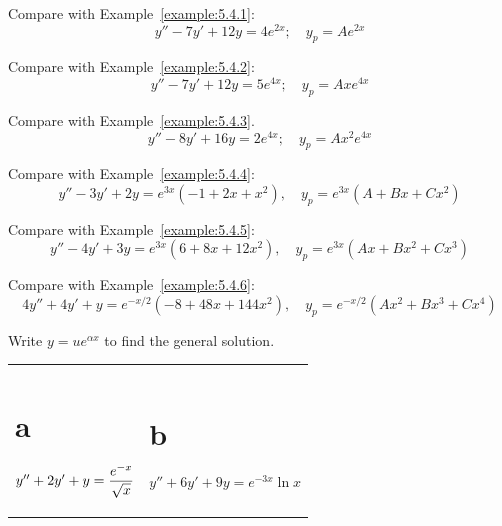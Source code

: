 \begin{exerciselist}

  \item\label{exer:5.4.31} Compare with Example~\ref{example:5.4.1}:
  \[
    y''-7y'+12y=4e^{2x};\quad y_{p}=Ae^{2x}
  \]

  \item\label{exer:5.4.32} Compare with Example~\ref{example:5.4.2}:
  \[
    y''-7y'+12y=5e^{4x};\quad y_{p}=Axe^{4x}
  \]

  \item\label{exer:5.4.33} Compare with Example~\ref{example:5.4.3}.
  \[
    y''-8y'+16y=2e^{4x};\quad y_{p}=Ax^{2}e^{4x}
  \]

  \item\label{exer:5.4.34} Compare with Example~\ref{example:5.4.4}:
  \[
    y''-3y'+2y=e^{3x}(-1+2x+x^{2}),\quad y_{p}=e^{3x}(A+Bx+Cx^{2})
  \]

  \item\label{exer:5.4.35} Compare with Example~\ref{example:5.4.5}:
  \[
    y''-4y'+3y=e^{3x}(6+8x+12x^{2}),\quad y_{p}=e^{3x}(Ax+Bx^{2}+Cx^{3})
  \]

  \item\label{exer:5.4.36} Compare with Example~\ref{example:5.4.6}:
  \[
    4y''+4y'+y=e^{-x/2}(-8+48x+144x^{2}),\quad y_{p}=e^{-x/2}(Ax^{2}+Bx^{3}+Cx^{4})
  \]

  \item\label{exer:5.4.37} Write $y=ue^{\alpha x}$ to find the general solution.

  \begin{tabular}[t]{@{}p{168pt}@{}p{168pt}}
    \part{a} $y''+2y'+y=\displaystyle\frac{e^{-x}}{\sqrt{x}}$ & \part{b} $y''+6y'+9y=e^{-3x}\ln x$                              \\

\end{tabular}
\end{exerciselist}
